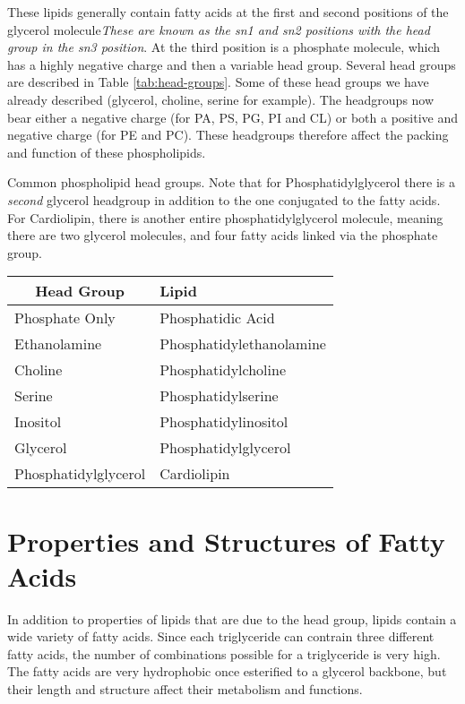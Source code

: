 \documentclass{tufte-handout}
\begin{document}
  These lipids generally contain fatty acids at the first and second positions of the glycerol molecule\emph{These are known as the sn1 and sn2 positions with the head group in the sn3 position}.  At the third position is a phosphate molecule, which has a highly negative charge and then a variable head group.  Several head groups are described in Table \ref{tab:head-groups}.  Some of these head groups we have already described (glycerol, choline, serine for example).  The headgroups now bear either a negative charge (for PA, PS, PG, PI and CL) or both a positive and negative charge (for PE and PC).  These headgroups therefore affect the packing and function of these phospholipids.  

\begin{margintable}
\centering
\caption{Common phospholipid head groups.  Note that for Phosphatidylglycerol there is a \emph{second} glycerol headgroup in addition to the one conjugated to the fatty acids.  For Cardiolipin, there is another entire phosphatidylglycerol molecule, meaning there are two glycerol molecules, and four fatty acids linked via the phosphate group.}
\label{tab:head-groups}
\begin{tabular}{ll}
\hline
\multicolumn{1}{c}{\textbf{Head Group}} & \textbf{Lipid} \\ \hline
Phosphate Only          & Phosphatidic Acid      \\
Ethanolamine           & Phosphatidylethanolamine           \\
Choline           & Phosphatidylcholine          \\
Serine        & Phosphatidylserine \\
Inositol & Phosphatidylinositol \\
Glycerol & Phosphatidylglycerol \\
Phosphatidylglycerol & Cardiolipin     
\end{tabular}
\end{margintable}

\section{Properties and Structures of Fatty Acids}

In addition to properties of lipids that are due to the head group, lipids contain a wide variety of fatty acids.  Since each triglyceride can contrain three different fatty acids, the number of combinations possible for a triglyceride is very high.  The fatty acids are very hydrophobic once esterified to a glycerol backbone, but their length and structure affect their metabolism and functions.
\end{document}
